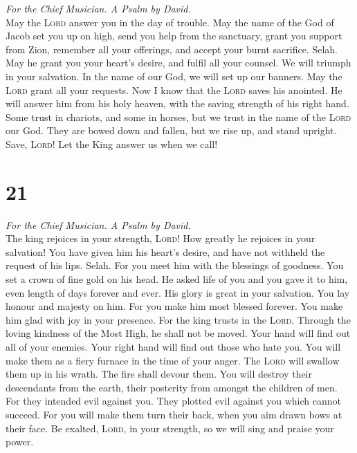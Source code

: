 \emph{For the Chief Musician. A Psalm by David.}\\
 May the \textsc{Lord} answer you in the day of trouble.
May the name of the God of Jacob set you up on high,  send
you help from the sanctuary, grant you support from Zion, 
remember all your offerings, and accept your burnt sacrifice. Selah.
 May he grant you your heart's desire, and fulfil all your
counsel.  We will triumph in your salvation. In the name
of our God, we will set up our banners. May the \textsc{Lord} grant all
your requests.  Now I know that the \textsc{Lord} saves
his anointed. He will answer him from his holy heaven, with the saving
strength of his right hand.  Some trust in chariots, and
some in horses, but we trust in the name of the \textsc{Lord} our God.
 They are bowed down and fallen, but we rise up, and stand
upright.  Save, \textsc{Lord}! Let the King answer us when
we call!

\hypertarget{section-20}{%
\section{21}\label{section-20}}

\emph{For the Chief Musician. A Psalm by David.}\\
 The king rejoices in your strength, \textsc{Lord}! How
greatly he rejoices in your salvation!  You have given him
his heart's desire, and have not withheld the request of his lips.
Selah.  For you meet him with the blessings of goodness.
You set a crown of fine gold on his head.  He asked life
of you and you gave it to him, even length of days forever and ever.
 His glory is great in your salvation. You lay honour and
majesty on him.  For you make him most blessed forever.
You make him glad with joy in your presence.  For the king
trusts in the \textsc{Lord}. Through the loving kindness of the Most
High, he shall not be moved.  Your hand will find out all
of your enemies. Your right hand will find out those who hate you.
 You will make them as a fiery furnace in the time of your
anger. The \textsc{Lord} will swallow them up in his wrath. The fire
shall devour them.  You will destroy their descendants
from the earth, their posterity from amongst the children of men.
 For they intended evil against you. They plotted evil
against you which cannot succeed.  For you will make them
turn their back, when you aim drawn bows at their face. 
Be exalted, \textsc{Lord}, in your strength, so we will sing and praise
your power.

